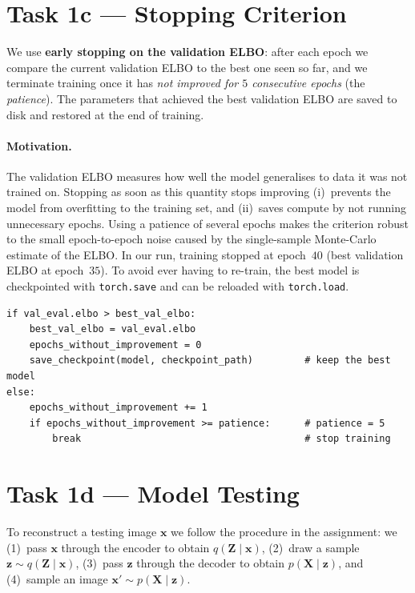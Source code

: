 \documentclass{article}
\newcommand{\bx}{\mathbf{x}}
\newcommand{\bX}{\mathbf{X}}
\newcommand{\bz}{\mathbf{z}}
\newcommand{\bZ}{\mathbf{Z}}
\begin{document}
\section*{Task 1c --- Stopping Criterion}

We use \textbf{early stopping on the validation ELBO}: after each epoch we
compare the current validation ELBO to the best one seen so far, and we
terminate training once it has \emph{not improved for $5$ consecutive epochs}
(the \emph{patience}). The parameters that achieved the best validation ELBO
are saved to disk and restored at the end of training.

\paragraph{Motivation.} The validation ELBO measures how well the model
generalises to data it was not trained on. Stopping as soon as this quantity
stops improving (i)~prevents the model from overfitting to the training set,
and (ii)~saves compute by not running unnecessary epochs. Using a patience of
several epochs makes the criterion robust to the small epoch-to-epoch noise
caused by the single-sample Monte-Carlo estimate of the ELBO. In our run,
training stopped at epoch~$40$ (best validation ELBO at epoch~$35$). To avoid
ever having to re-train, the best model is checkpointed with
\texttt{torch.save} and can be reloaded with \texttt{torch.load}.

\begin{lstlisting}[caption={Early stopping and checkpointing (\texttt{vae/training.py}).}]
if val_eval.elbo > best_val_elbo:
    best_val_elbo = val_eval.elbo
    epochs_without_improvement = 0
    save_checkpoint(model, checkpoint_path)         # keep the best model
else:
    epochs_without_improvement += 1
    if epochs_without_improvement >= patience:      # patience = 5
        break                                       # stop training
\end{lstlisting}

\section*{Task 1d --- Model Testing}

To reconstruct a testing image $\bx$ we follow the procedure in the
assignment: we (1)~pass $\bx$ through the encoder to obtain $q(\bZ \mid \bx)$,
(2)~draw a sample $\bz \sim q(\bZ \mid \bx)$, (3)~pass $\bz$ through the decoder
to obtain $p(\bX \mid \bz)$, and (4)~sample an image $\bx' \sim p(\bX \mid \bz)$.
\end{document}
